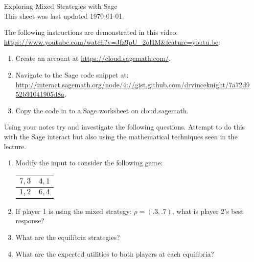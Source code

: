 \documentclass[12pt]{article}
\begin{document}
\begin{center}
\Huge{Exploring Mixed Strategies with Sage\\\tiny{This sheet was last updated \today.} }
\end{center}

The following instructions are demonstrated in this video: \url{https://www.youtube.com/watch?v=Jfz9pU_2oHM&feature=youtu.be}:

\begin{enumerate}
    \item Create an account at \url{https://cloud.sagemath.com/}.
    \item Navigate to the Sage code snippet at: \url{http://interact.sagemath.org/node/4://gist.github.com/drvinceknight/7a72d952b91041905d8a}.\\
    \item Copy the code in to a Sage worksheet on cloud.sagemath.
\end{enumerate}

Using your notes try and investigate the following questions. Attempt to do this with the Sage interact but also using the mathematical techniques seen in the lecture.


\begin{enumerate}
\item Modify the input to consider the following game:
\begin{center}
\begin{tabular}{|c|c|}
\hline
$7,3$&$4,1$\\\hline
$1,2$&$6,4$\\
\hline
\end{tabular}
\end{center}
\item If player 1 is using the mixed strategy: $\rho=(.3,.7)$, what is player 2's best response?
\item What are the equilibria strategies?
\item What are the expected utilities to both players at each equilibria?
\end{enumerate}
\end{document}

